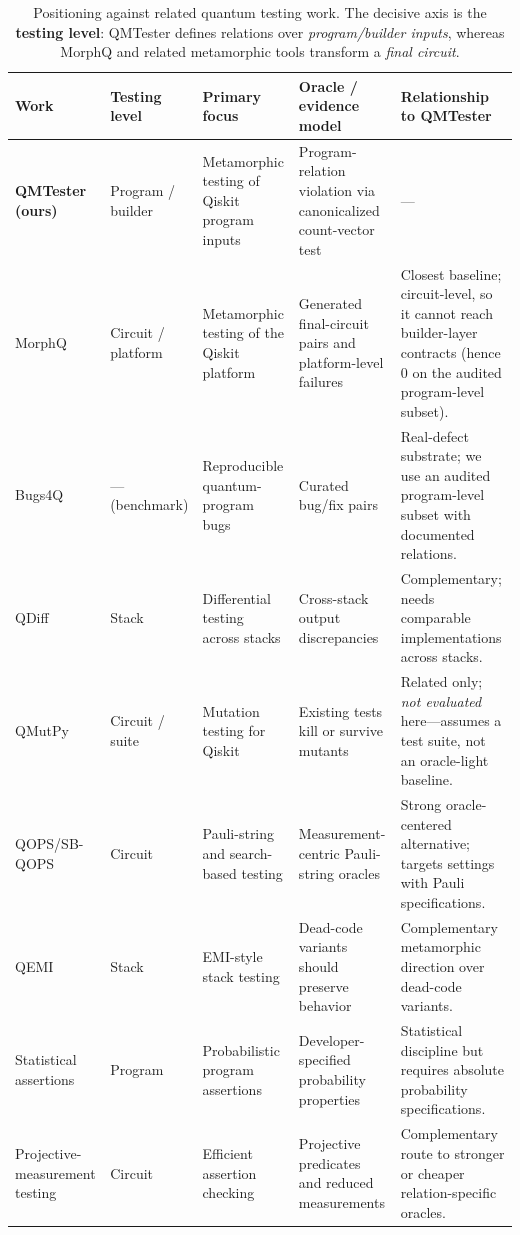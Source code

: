 \begin{table}[t]
\centering
\caption{Positioning against related quantum testing work. The decisive axis is the \textbf{testing level}: QMTester defines relations over \emph{program/builder inputs}, whereas MorphQ and related metamorphic tools transform a \emph{final circuit}.}
\label{tab:related-comparison}
\scriptsize
\setlength{\tabcolsep}{2.5pt}
\begin{tabular}{@{}p{}p{}p{}p{}p{}@{}}
\toprule
\textbf{Work} & \textbf{Testing level} & \textbf{Primary focus} & \textbf{Oracle / evidence model} & \textbf{Relationship to QMTester} \\
\midrule
\textbf{QMTester (ours)} & Program / builder & Metamorphic testing of Qiskit program inputs & Program-relation violation via canonicalized count-vector test & --- \\
MorphQ~\cite{paltenghi2023morphq} & Circuit / platform & Metamorphic testing of the Qiskit platform & Generated final-circuit pairs and platform-level failures & Closest baseline; circuit-level, so it cannot reach builder-layer contracts (hence $0$ on the audited program-level subset). \\
Bugs4Q~\cite{miao2023bugs4q} & --- (benchmark) & Reproducible quantum-program bugs & Curated bug/fix pairs & Real-defect substrate; we use an audited program-level subset with documented relations. \\
QDiff~\cite{wang2021qdiff} & Stack & Differential testing across stacks & Cross-stack output discrepancies & Complementary; needs comparable implementations across stacks. \\
QMutPy~\cite{fortunato2022qmutpy} & Circuit / suite & Mutation testing for Qiskit & Existing tests kill or survive mutants & Related only; \emph{not evaluated} here---assumes a test suite, not an oracle-light baseline. \\
QOPS/SB-QOPS~\cite{muqeet2024qops,muqeet2026sbqops} & Circuit & Pauli-string and search-based testing & Measurement-centric Pauli-string oracles & Strong oracle-centered alternative; targets settings with Pauli specifications. \\
QEMI~\cite{luo2026qemi} & Stack & EMI-style stack testing & Dead-code variants should preserve behavior & Complementary metamorphic direction over dead-code variants. \\
Statistical assertions~\cite{huang2019statistical} & Program & Probabilistic program assertions & Developer-specified probability properties & Statistical discipline but requires absolute probability specifications. \\
Projective-measurement testing~\cite{li2020projection,oldfield2025faster} & Circuit & Efficient assertion checking & Projective predicates and reduced measurements & Complementary route to stronger or cheaper relation-specific oracles. \\
\bottomrule
\end{tabular}
\end{table}
